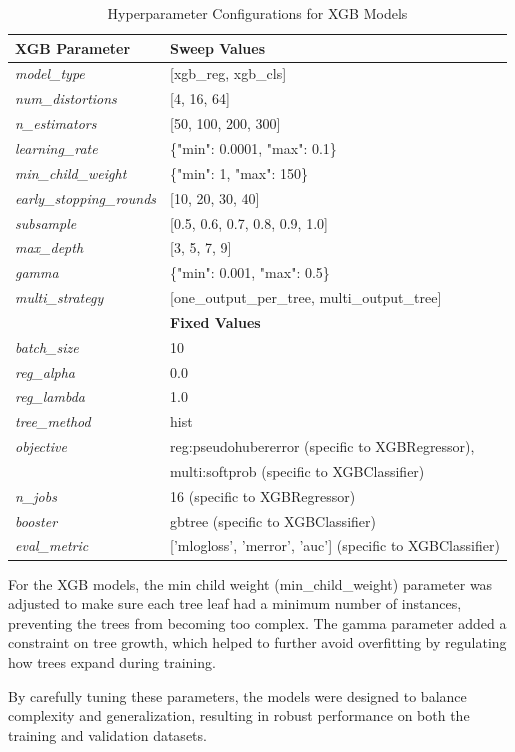 \begin{table}[ht]
\centering
\begin{tabular}{|l|l|}
\hline
\textbf{XGB Parameter} & \textbf{Sweep Values} \\
\hline
\textit{model\_type} & [xgb\_reg, xgb\_cls] \\
\textit{num\_distortions} & [4, 16, 64] \\
\textit{n\_estimators} & [50, 100, 200, 300] \\
\textit{learning\_rate} & \{"min": 0.0001, "max": 0.1\} \\
\textit{min\_child\_weight} & \{"min": 1, "max": 150\} \\
\textit{early\_stopping\_rounds} & [10, 20, 30, 40] \\
\textit{subsample} & [0.5, 0.6, 0.7, 0.8, 0.9, 1.0] \\
\textit{max\_depth} & [3, 5, 7, 9] \\
\textit{gamma} & \{"min": 0.001, "max": 0.5\} \\
\textit{multi\_strategy} & [one\_output\_per\_tree, multi\_output\_tree]\\
\hline
\textbf{} & \textbf{Fixed Values} \\
\hline
\textit{batch\_size} & 10 \\
\textit{reg\_alpha} & 0.0 \\
\textit{reg\_lambda} & 1.0 \\
\textit{tree\_method} & hist \\
\textit{objective} & reg:pseudohubererror (specific to XGBRegressor), \\
\textit{} & multi:softprob (specific to XGBClassifier)\\
\textit{n\_jobs} & 16 (specific to XGBRegressor)\\
\textit{booster} & gbtree (specific to XGBClassifier)\\
\textit{eval\_metric} & ['mlogloss', 'merror', 'auc'] (specific to XGBClassifier)\\
\hline
\end{tabular}
\caption{Hyperparameter Configurations for XGB Models}
\label{table:xgb_hyperparams}
\end{table}

\noindent
For the XGB models, the min child weight (min\_child\_weight) parameter was adjusted to make sure each tree leaf had a minimum number of instances, preventing the trees from becoming too complex. The gamma parameter added a constraint on tree growth, which helped to further avoid overfitting by regulating how trees expand during training. \par
\vspace{\baselineskip}
\noindent
By carefully tuning these parameters, the models were designed to balance complexity and generalization, resulting in robust performance on both the training and validation datasets.\par

